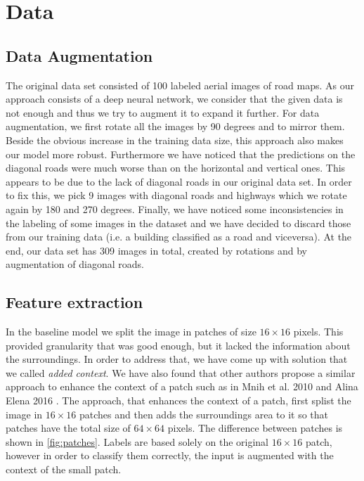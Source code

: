 \documentclass[10pt,conference,compsocconf]{IEEEtran}
\begin{document}
\section{Data}
\label{sec:Data}

\subsection{Data Augmentation}
\label{sec:data_aug}
The original data set consisted of 100 labeled aerial images of road maps. As our approach consists of a
deep neural network, we consider that the given data is not enough and thus we try to augment it to expand it further.
For data augmentation, we first rotate all the images by 90 degrees and to mirror them. Beside the obvious increase
in the training data size, this approach also makes our model more robust. Furthermore we have noticed that the 
predictions on the diagonal roads were much worse than on the horizontal and vertical ones. This appears to be due to
the lack of diagonal roads in our original data set. In order to fix this, we pick 9 images with diagonal
roads and highways which we rotate again by 180 and 270 degrees. Finally, we have noticed some inconsistencies
in the labeling of some images  in the dataset and we have decided to discard those from our training data (i.e. a building classified as a road and viceversa). At the end, our data set has 309 images in total, created by rotations and by augmentation of diagonal roads.

\subsection{Feature extraction}
\label{sec:feature}
In the baseline model we split the image in patches of size $16\times16$ pixels. This provided granularity
that was good enough, but it lacked the information about the surroundings. In order to address that, we have come up
with solution that we called \textit{added context}. We have also found that other authors propose a similar approach to enhance the context of a patch such as in Mnih et al. 2010 \cite{Mnih2010} and Alina Elena 2016 \cite{mthesis}. The approach, that enhances the context of a patch, first splist the image in $16\times16$ patches and then adds the 
surroundings area to it so that patches have the total size of $64\times64$ pixels. The difference between patches is
shown in \ref{fig:patches}. Labels are based solely on the original $16\times16$ patch, however in order to classify them correctly, the input is augmented with the context of the small patch.
\end{document}
